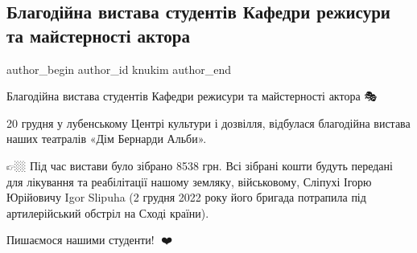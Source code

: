  
 
 
 
 
 
\subsection{Благодійна вистава студентів Кафедри режисури та майстерності актора}
\label{sec:22_12_2022.fb.knukim.1.vystava_lubny}
 
\ifcmt
 author_begin
   author_id knukim
 author_end
\fi

Благодійна вистава студентів Кафедри режисури та майстерності актора 🎭🙏🏼

20 грудня у лубенському Центрі культури і дозвілля, відбулася благодійна
вистава наших театралів «Дім Бернарди Альби».

👉🏼 Під час вистави було зібрано 8538 грн. Всі зібрані кошти будуть передані
для лікування та реабілітації нашому земляку, військовому, Сліпухі Ігорю
Юрійовичу Igor Slipuha (2 грудня 2022 року його бригада потрапила під
артилерійський обстріл на Сході країни).

Пишаємося нашими студенти! 🥺❤️

